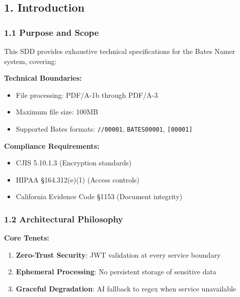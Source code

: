 \documentclass[
]{article}
\providecommand{\tightlist}{%
  \setlength{\itemsep}{0pt}\setlength{\parskip}{0pt}}
\begin{document}
\hypertarget{introduction}{%
\subsection{\texorpdfstring{\textbf{1.
Introduction}}{1. Introduction}}\label{introduction}}

\hypertarget{purpose-and-scope}{%
\subsubsection{\texorpdfstring{\textbf{1.1 Purpose and
Scope}}{1.1 Purpose and Scope}}\label{purpose-and-scope}}

This SDD provides exhaustive technical specifications for the Bates
Namer system, covering:

\textbf{Technical Boundaries:}

\begin{itemize}
\tightlist
\item
  File processing: PDF/A-1b through PDF/A-3
\item
  Maximum file size: 100MB
\item
  Supported Bates formats: \texttt{//00001}, \texttt{BATES00001},
  \texttt{{[}00001{]}}
\end{itemize}

\textbf{Compliance Requirements:}

\begin{itemize}
\tightlist
\item
  CJIS 5.10.1.3 (Encryption standards)
\item
  HIPAA §164.312(e)(1) (Access controls)
\item
  California Evidence Code §1153 (Document integrity)
\end{itemize}

\hypertarget{architectural-philosophy}{%
\subsubsection{\texorpdfstring{\textbf{1.2 Architectural
Philosophy}}{1.2 Architectural Philosophy}}\label{architectural-philosophy}}

\textbf{Core Tenets:}

\begin{enumerate}
\def\labelenumi{\arabic{enumi}.}
\tightlist
\item
  \textbf{Zero-Trust Security}: JWT validation at every service boundary
\item
  \textbf{Ephemeral Processing}: No persistent storage of sensitive data
\item
  \textbf{Graceful Degradation}: AI fallback to regex when service
  unavailable
\end{enumerate}
\end{document}
